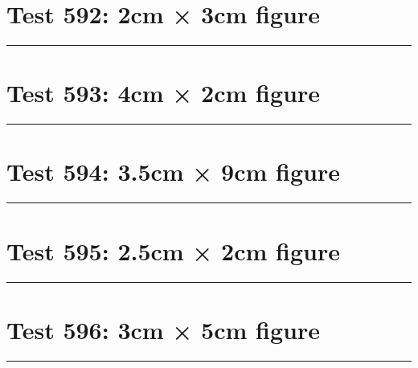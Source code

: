\documentclass[a4paper,11pt]{article}
\begin{document}
\section*{Test 592: 2cm × 3cm figure}
\begin{swarmwrap}%
  \begin{minipage}[t]{2cm}
    \centering
    \rule{\linewidth}{3cm}
  \end{minipage}%
\end{swarmwrap}%
\swarmwrapnext
\lipsum[116]
\lipsum[117]
\lipsum[118]
\section*{Test 593: 4cm × 2cm figure}
\begin{swarmwrap}%
  \begin{minipage}[t]{4cm}
    \centering
    \rule{\linewidth}{2cm}
  \end{minipage}%
\end{swarmwrap}%
\swarmwrapnext
\lipsum[13]
\lipsum[14]
\lipsum[15]
\lipsum[16]
\section*{Test 594: 3.5cm × 9cm figure}
\begin{swarmwrap}%
  \begin{minipage}[t]{3cm}
    \centering
    \rule{\linewidth}{9cm}
  \end{minipage}%
\end{swarmwrap}%
\swarmwrapnext
\lipsum[140]
\lipsum[141]
\lipsum[142]
\lipsum[143]
\section*{Test 595: 2.5cm × 2cm figure}
\begin{swarmwrap}%
  \begin{minipage}[t]{2cm}
    \centering
    \rule{\linewidth}{2cm}
  \end{minipage}%
\end{swarmwrap}%
\swarmwrapnext
\lipsum[130]
\lipsum[131]
\lipsum[132]
\lipsum[133]
\section*{Test 596: 3cm × 5cm figure}
\begin{swarmwrap}%
  \begin{minipage}[t]{3cm}
    \centering
    \rule{\linewidth}{5cm}
  \end{minipage}%
\end{swarmwrap}%
\swarmwrapnext
\lipsum[149]
\lipsum[150]
\lipsum[1]
\lipsum[2]
\lipsum[3]
\end{document}
